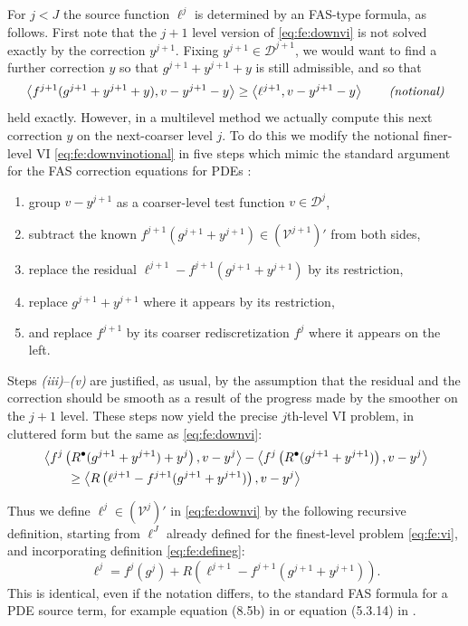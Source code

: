 \documentclass[letterpaper,final,12pt,reqno]{amsart}
\theoremstyle{cstyle}
\theoremstyle{cstyle*}
\theoremstyle{dstyle}
\numberwithin{equation}{section}
\numberwithin{figure}{section}
\numberwithin{table}{section}
\numberwithin{theorem}{section}
\newcommand{\ip}[2]{\left<#1,#2\right>}
\newcommand{\iR}{R^{\bullet}}
\begin{document}
For $j<J$ the source function $\ell^j$ is determined by an FAS-type formula, as follows.  First note that the $j+1$ level version of \eqref{eq:fe:downvi} is not solved exactly by the correction $y^{j+1}$.  Fixing $y^{j+1} \in \mathcal{D}^{j+1}$, we would want to find a further correction $y$ so that $g^{j+1}+y^{j+1}+y$ is still admissible, and so that
\begin{equation}
\ip{f^{j+1}(g^{j+1}+y^{j+1}+y)}{v-y^{j+1}-y} \ge \ip{\ell^{j+1}}{v-y^{j+1}-y} \qquad \text{\emph{(notional)}} \label{eq:fe:downvinotional}
\end{equation}
held exactly.  However, in a multilevel method we actually compute this next correction $y$ on the next-coarser level $j$.  To do this we modify the notional finer-level VI \eqref{eq:fe:downvinotional} in five steps which mimic the standard argument for the FAS correction equations for PDEs \cite{BrandtLivne2011,Trottenbergetal2001}:
\begin{enumerate}
\item group $v-y^{j+1}$ as a coarser-level test function $v\in \mathcal{D}^j$,
\item subtract the known $f^{j+1}(g^{j+1}+y^{j+1}) \in (\mathcal{V}^{j+1})'$ from both sides,
\item replace the residual $\ell^{j+1}-f^{j+1}(g^{j+1}+y^{j+1})$ by its restriction,
\item replace $g^{j+1}+y^{j+1}$ where it appears by its restriction,
\item and replace $f^{j+1}$ by its coarser rediscretization $f^j$ where it appears on the left.
\end{enumerate}
Steps \emph{(iii)}--\emph{(v)} are justified, as usual, by the assumption that the residual and the correction should be smooth as a result of the progress made by the smoother on the $j+1$ level.  These steps now yield the precise $j$th-level VI problem, in cluttered form but the same as \eqref{eq:fe:downvi}:
\begin{align}
&\ip{f^j\left(\iR(g^{j+1}+y^{j+1})+y^j\right)}{v-y^j} - \ip{f^j\left(\iR(g^{j+1}+y^{j+1})\right)}{v-y^j} \label{eq:fe:downvicluttered} \\
&\qquad \ge \ip{R\left(\ell^{j+1}-f^{j+1}(g^{j+1}+y^{j+1})\right)}{v-y^j} \notag
\end{align}

Thus we define $\ell^j \in (\mathcal{V}^j)'$ in \eqref{eq:fe:downvi} by the following recursive definition, starting from $\ell^J$ already defined for the finest-level problem \eqref{eq:fe:vi}, and incorporating definition \eqref{eq:fe:defineg}:
\begin{equation}
\ell^j = f^j(g^j) + R\left(\ell^{j+1}-f^{j+1}(g^{j+1}+y^{j+1})\right). \label{eq:fe:levelsource}
\end{equation}
This is identical, even if the notation differs, to the standard FAS formula for a PDE source term, for example equation (8.5b) in \cite{BrandtLivne2011} or equation (5.3.14) in \cite{Trottenbergetal2001}.
\end{document}
